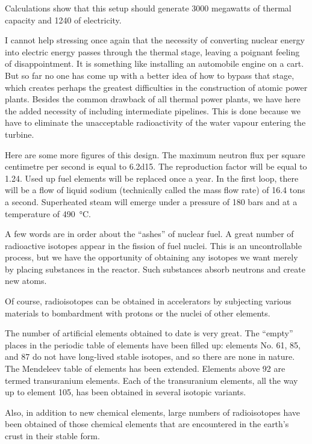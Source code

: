 Calculations show that this setup should generate 3000 megawatts of thermal capacity and 1240 of electric­ity.

I cannot help stressing once again that the necessity of converting nuclear energy into electric energy passes through the thermal stage, leaving a poignant feeling of disappointment. It is something like installing an auto­mobile engine on a cart. But so far no one has come up with a better idea of how to bypass that stage, which creates perhaps the greatest difficulties in the construction of atomic power plants. Besides the common drawback of all thermal power plants, we have here the added necessity of including intermediate pipelines. This is done because we have to eliminate the unacceptable radioac­tivity of the water vapour entering the turbine.

Here are some more figures of this design. The maximum neutron flux per square centimetre per second is equal to \num{6.2d15}. The reproduction factor will be equal to 1.24. Used up fuel elements will be replaced once a year. In the first loop, there will be a flow of liquid sodium (technically called the mass flow rate) of 16.4 tons a second. Superheated steam will emerge under a pressure of 180 bars and at a temperature of \SI{490}{\celsius}.

A few words are in order about the ``ashes'' of nuclear fuel. A great number of radioactive isotopes appear in the fission of fuel nuclei. This is an uncontrollable process, but we have the opportunity of obtaining any isotopes we want merely by placing substances in the reactor. Such substances absorb neutrons and create new atoms.

Of course, radioisotopes can be obtained in accelerators by subjecting various materials to bombardment with protons or the nuclei of other elements.

The number of artificial elements obtained to date is very great. The ``empty'' places in the periodic table of elements have been filled up: elements No. 61, 85, and 87 do not have long-lived stable isotopes, and so there are none in nature. The Mendeleev table of elements has been extended. Elements above 92 are termed transura­nium elements. Each of the transuranium elements, all the way up to element 105, has been obtained in several isotopic variants.

Also, in addition to new chemical elements, large num­bers of radioisotopes have been obtained of those chemical elements that are encountered in the earth's crust in their stable form.

